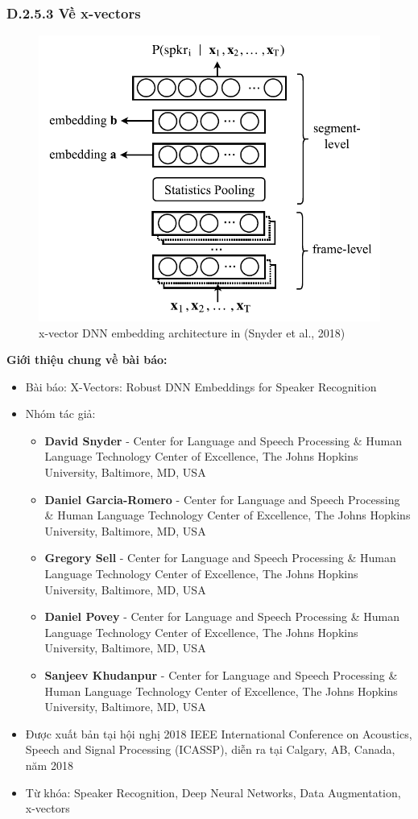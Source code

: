 \documentclass{article}
\begin{document}
	\subsubsection{D.2.5.3 Về x-vectors}
	\begin{figure}[H]
		\centering
		\includegraphics[width=0.75\linewidth]{images/x-vector.jpg}
		\caption{x-vector DNN embedding architecture in (Snyder et al., 2018)}
		\label{fig:writing-thesis}
	\end{figure}

	\textbf{Giới thiệu chung về bài báo:}
	\begin{itemize}
		\item Bài báo: X-Vectors: Robust DNN Embeddings for Speaker Recognition
		\item Nhóm tác giả: 
			\begin{itemize}
				\item \textbf{David Snyder} - Center for Language and Speech Processing \& Human Language Technology Center of Excellence, The Johns Hopkins University, Baltimore, MD, USA
				\item \textbf{Daniel Garcia-Romero} - Center for Language and Speech Processing \& Human Language Technology Center of Excellence, The Johns Hopkins University, Baltimore, MD, USA
				\item \textbf{Gregory Sell} - Center for Language and Speech Processing \& Human Language Technology Center of Excellence, The Johns Hopkins University, Baltimore, MD, USA
				\item \textbf{Daniel Povey} - Center for Language and Speech Processing \& Human Language Technology Center of Excellence, The Johns Hopkins University, Baltimore, MD, USA
				\item \textbf{Sanjeev Khudanpur} - Center for Language and Speech Processing \& Human Language Technology Center of Excellence, The Johns Hopkins University, Baltimore, MD, USA
			\end{itemize}
		\item Được xuất bản tại hội nghị 2018 IEEE International Conference on Acoustics, Speech and Signal Processing (ICASSP), diễn ra tại Calgary, AB, Canada, năm 2018
		\item Từ khóa: Speaker Recognition, Deep Neural Networks, Data Augmentation, x-vectors
	\end{itemize}
	
\end{document}

